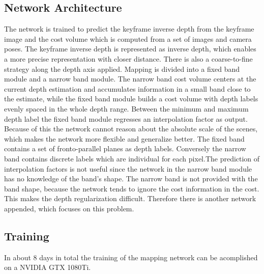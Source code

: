 \subsection{Network Architecture}
The network is trained to predict the keyframe inverse depth from the keyframe image and the cost volume which is computed from a set of images and camera poses. The keyframe inverse depth is represented as inverse depth, which enables a more precise representation with closer distance. There is also a coarse-to-fine strategy along the depth axis applied. Mapping is divided into a fixed band module and a narrow band module. The narrow band cost volume centers at the current depth estimation and accumulates information in a small band close to the estimate, while the fixed band module builds a cost volume with depth labels evenly spaced in the whole depth range.
\newline
\newline
Between the minimum and maximum depth label the fixed band module regresses an interpolation factor as output. Because of this the network cannot reason about the absolute scale of the scenes, which makes the network more flexible and generalize better. The fixed band contains a set of fronto-parallel planes as depth labels. Conversely the narrow band contains discrete labels which are individual for each pixel.The prediction of interpolation factors is not useful since the network in the narrow band module has no knowledge of the band’s shape. The narrow band is not provided with the band shape, because the network tends to ignore the cost information in the cost. This makes the depth regularization difficult. Therefore there is another network appended, which focuses on this problem.

\subsection{Training}
In about 8 days in total the training of the mapping network can be acomplished on a NVIDIA GTX 1080Ti.





